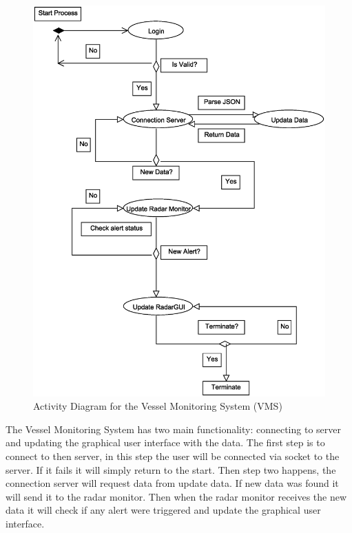 \documentclass{article}
\begin{document}
\break
\begin{figure}[!htb]
\caption{Activity Diagram for the Vessel Monitoring System (VMS) }
\centering
\includegraphics[scale=0.3]{diagrams/vms-activity-diagram.eps}
\end{figure}
The Vessel Monitoring System has two main functionality: connecting to server and updating the graphical user interface with the data.
The first step is to connect to then server, in this step the user will be connected via socket to the server.
If it fails it will simply return to the start.
Then step two happens, the connection server will request data from update data. If new data was found it will send it to the radar monitor.
Then when the radar monitor receives the new data it will check if any alert were triggered and update the graphical user interface.
\end{document}
